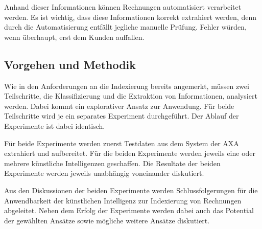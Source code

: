 Anhand dieser Informationen können Rechnungen automatisiert verarbeitet werden. Es ist wichtig, dass diese Informationen korrekt extrahiert werden, denn durch die Automatisierung entfällt jegliche manuelle Prüfung. Fehler würden, wenn überhaupt, erst dem Kunden auffallen. 


\subsection{Vorgehen und Methodik}

Wie in den Anforderungen an die Indexierung bereits angemerkt, müssen zwei Teilschritte, die Klassifizierung und die Extraktion von Informationen, analysiert werden. Dabei kommt ein explorativer Ansatz zur Anwendung. Für beide Teilschritte wird je ein separates Experiment durchgeführt. Der Ablauf der Experimente ist dabei identisch. 

Für beide Experimente werden zuerst Testdaten aus dem System der AXA extrahiert und aufbereitet. Für die beiden Experimente werden jeweils eine oder mehrere künstliche Intelligenzen geschaffen. Die Resultate der beiden Experimente werden jeweils unabhängig voneinander diskutiert.

Aus den Diskussionen der beiden Experimente werden Schlussfolgerungen für die Anwendbarkeit der künstlichen Intelligenz zur Indexierung von Rechnungen abgeleitet. Neben dem Erfolg der Experimente werden dabei auch das Potential der gewählten Ansätze sowie mögliche weitere Ansätze diskutiert.




